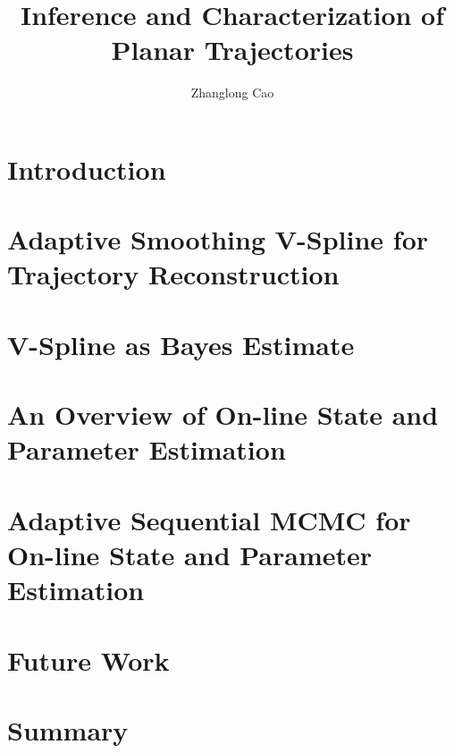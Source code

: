 \documentclass[12pt,twoside]{report}
\title{Inference and Characterization of Planar Trajectories}
\author{Zhanglong Cao}
\date{}
\begin{document}
\frontstuff

\linespread{1.3} \normalsize


\chapter{Introduction}\label{ChapterIntro}

\clearemptydoublepage

\chapter{Adaptive Smoothing V-Spline for Trajectory Reconstruction}\label{ChapterTS}



\clearemptydoublepage

\chapter{V-Spline as Bayes Estimate}\label{ChapterGPR}

\clearemptydoublepage

\chapter{An Overview of On-line State and Parameter Estimation}\label{ChapterFR}

\clearemptydoublepage

\chapter{Adaptive Sequential MCMC for On-line State and Parameter Estimation}\label{ChapterMCMC}

\clearemptydoublepage

%


\chapter{Future Work}\label{ChapterFuture}

\clearemptydoublepage


\chapter{Summary}\label{ChapterSummary}

\clearemptydoublepage
\end{document}

